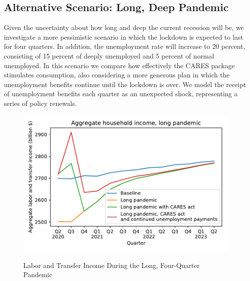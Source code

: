 \documentclass[titlepage]{\econtex}
\begin{document}
\subsection{Alternative Scenario: Long, Deep Pandemic} \label{sec:longPandemic}

Given the uncertainty about how long and deep the current recession will be, we investigate a more pessimistic scenario in which the lockdown is expected to last for four quarters.  
In addition, the unemployment rate will increase to 20 percent, consisting of 15 percent of deeply unemployed and 5 percent of normal unemployed.  
In this scenario we compare how effectively the CARES package stimulates consumption, also considering a more generous plan in which the unemployment benefits continue until the lockdown is over.
We model the receipt of unemployment benefits each quarter as an unexpected shock, representing a series of policy renewals.

\begin{figure}
  \centering
  \caption{Labor and Transfer Income During the Long, Four-Quarter Pandemic}
  \label{inc_response_pandemic}
  { \includegraphics[width=8in]{./Figures/AggLT_long_pandemic}}
\end{figure}
\end{document}
